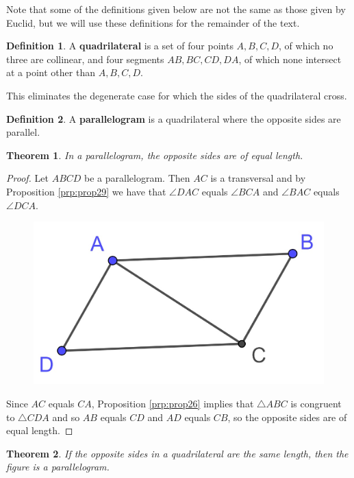 \documentclass[
]{book}
\newtheorem{theorem}{Theorem}[chapter]
\theoremstyle{definition}
\newtheorem{definition}{Definition}[chapter]
\theoremstyle{definition}
\theoremstyle{definition}
\theoremstyle{definition}
\theoremstyle{remark}
\begin{document}
Note that some of the definitions given below are not the same as those given by Euclid, but we will use these definitions for the remainder of the text.

\begin{definition}
A \textbf{quadrilateral} is a set of four points \(A, B, C, D\), of which no three are collinear, and four segments \(AB, BC, CD, DA\), of which none intersect at a point other than \(A,B,C,D\).
\end{definition}

This eliminates the degenerate case for which the sides of the quadrilateral cross.

\begin{definition}
A \textbf{parallelogram} is a quadrilateral where the opposite sides are parallel.
\end{definition}

\begin{theorem}
In a parallelogram, the opposite sides are of equal length.\label{thm_parallelogram_opp_sides}
\end{theorem}

\begin{proof}
Let \(ABCD\) be a parallelogram. Then \(AC\) is a transversal and by Proposition \ref{prp:prop29} we have that \(\angle DAC\) equals \(\angle BCA\) and \(\angle BAC\) equals \(\angle DCA\).

\begin{figure}

{\centering \includegraphics[width=0.2\linewidth]{images/Parallelogram1} 

}

\end{figure}

Since \(AC\) equals \(CA\), Proposition \ref{prp:prop26} implies that \(\triangle ABC\) is congruent to \(\triangle CDA\) and so \(AB\) equals \(CD\) and \(AD\) equals \(CB\), so the opposite sides are of equal length.
\end{proof}

\begin{theorem}
\protect\hypertarget{thm:parallelogram-opposite-sides}{}\label{thm:parallelogram-opposite-sides}If the opposite sides in a quadrilateral are the same length, then the figure is a parallelogram.
\end{theorem}
\end{document}

